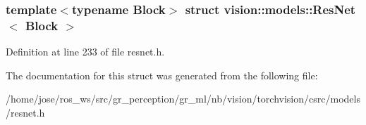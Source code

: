 \subsubsection*{template$<$typename Block$>$\newline
struct vision\+::models\+::\+Res\+Net$<$ Block $>$}



Definition at line 233 of file resnet.\+h.



The documentation for this struct was generated from the following file\+:\begin{DoxyCompactItemize}
\item 
/home/jose/ros\+\_\+ws/src/gr\+\_\+perception/gr\+\_\+ml/nb/vision/torchvision/csrc/models/resnet.\+h\end{DoxyCompactItemize}
